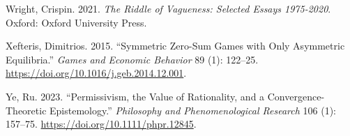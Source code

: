 \documentclass[
  12pt,
  letterpaper,
  DIV=11,
  numbers=noendperiod]{scrreprt}
\newlength{\cslhangindent}
\newenvironment{CSLReferences}[2] %
 {\begin{list}{}{%
  \setlength{\itemindent}{0pt}
  \setlength{\leftmargin}{0pt}
  \setlength{\parsep}{0pt}
  \ifodd #1
   \setlength{\leftmargin}{\cslhangindent}
   \setlength{\itemindent}{-1\cslhangindent}
  \fi
  \setlength{\itemsep}{#2\baselineskip}}}
 {\end{list}}
\begin{document}
\begin{CSLReferences}{1}{0}
Wright, Crispin. 2021. \emph{The Riddle of Vagueness: Selected Essays
1975-2020}. Oxford: Oxford University Press.

Xefteris, Dimitrios. 2015. {``Symmetric Zero-Sum Games with Only
Asymmetric Equilibria.''} \emph{Games and Economic Behavior} 89 (1):
122--25. \url{https://doi.org/10.1016/j.geb.2014.12.001}.

Ye, Ru. 2023. {``Permissivism, the Value of Rationality, and a
Convergence-Theoretic Epistemology.''} \emph{Philosophy and
Phenomenological Research} 106 (1): 157--75.
\url{https://doi.org/10.1111/phpr.12845}.

\end{CSLReferences}
\end{document}
